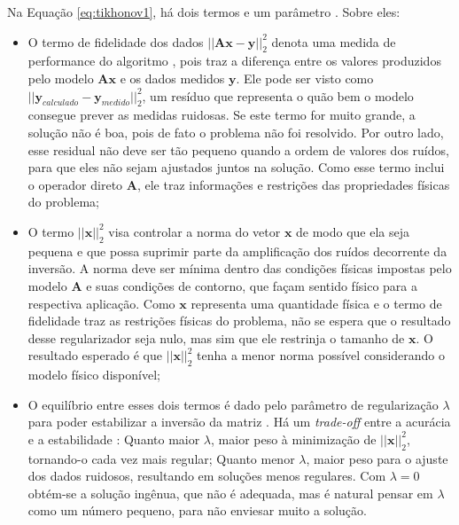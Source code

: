 Na Equação \eqref{eq:tikhonov1}, há dois termos e um parâmetro \cite[pág. 8]{Benning2018}. Sobre eles:
\begin{itemize}
\item O termo de fidelidade dos dados $\vert \vert \mathbf{A}\mathbf{x} - \mathbf{y}\vert \vert^2_2$ denota uma medida de performance do algoritmo \cite[pág. 308]{Bertero2021}, pois traz a diferença entre os valores produzidos pelo modelo $\mathbf{A}\mathbf{x}$ e os dados medidos $\mathbf{y}$. Ele pode ser visto como $\vert \vert \mathbf{y}_{calculado} - \mathbf{y}_{medido}\vert \vert^2_2$, um resíduo que representa o quão bem o modelo consegue prever as medidas ruidosas. Se este termo for muito grande, a solução não é boa, pois de fato o problema não foi resolvido. Por outro lado, esse residual não deve ser tão pequeno quando a ordem de valores dos ruídos, para que eles não sejam ajustados juntos na solução. Como esse termo inclui o operador direto $\mathbf{A}$, ele traz informações e restrições das propriedades físicas do problema;
\item O termo $ \vert \vert \mathbf{x}\vert \vert^2_2$ visa controlar a norma do vetor $\mathbf{x}$ de modo que ela seja pequena e que possa suprimir parte da amplificação dos ruídos decorrente da inversão. A norma deve ser mínima dentro das condições físicas impostas pelo modelo $\mathbf{A}$ e suas condições de contorno, que façam sentido físico para a respectiva aplicação. Como $\mathbf{x}$ representa uma quantidade física e o termo de fidelidade traz as restrições físicas do problema, não se espera que o resultado desse regularizador seja nulo, mas sim que ele restrinja o tamanho de $\mathbf{x}$. O resultado esperado é que $ \vert \vert \mathbf{x}\vert \vert^2_2$ tenha a menor norma possível considerando o modelo físico disponível;
\item O equilíbrio entre esses dois termos é dado pelo parâmetro de regularização $\lambda$ para poder estabilizar a inversão da matriz \cite{Prato2008}. Há um \textit{trade-off} entre a acurácia e a estabilidade \cite[pág. 2804]{Chen2002}: Quanto maior $\lambda$, maior peso à minimização de $ \vert \vert \mathbf{x}\vert \vert^2_2$, tornando-o cada vez mais regular; Quanto menor $\lambda$, maior peso para o ajuste dos dados ruidosos, resultando em soluções menos regulares. Com $\lambda = 0$ obtém-se a solução ingênua, que não é adequada, mas é natural pensar em $\lambda$ como um número pequeno, para não enviesar muito a solução. 

\end{itemize}


